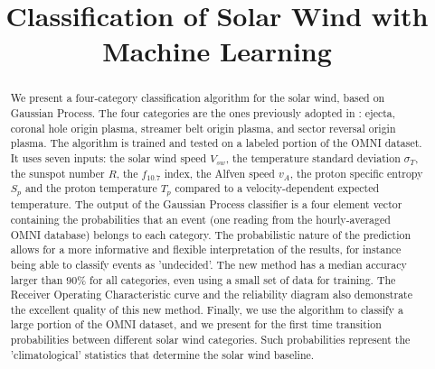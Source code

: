 \documentclass[draft,jgrga]{agutex}
\begin{document}
%
%


\title{Classification of Solar Wind with Machine Learning}
%

%

%
%









%
%


\begin{abstract}
We present a four-category classification algorithm for the solar wind, based on Gaussian Process. The four categories are the ones previously adopted in \citet{xu2015}: ejecta, coronal hole origin plasma, streamer belt origin plasma, and sector reversal origin plasma. The algorithm is trained and tested on a labeled portion of the OMNI dataset. It uses seven inputs: the solar wind speed $V_{sw}$, the temperature standard deviation $\sigma_T$, the sunspot number $R$, the $f_{10.7}$ index, the Alfven speed $v_A$, the proton specific entropy $S_p$ and the proton temperature $T_p$ compared to a velocity-dependent expected temperature. 
The output of the Gaussian Process classifier is a four element vector containing the probabilities that an event (one reading from the hourly-averaged OMNI database) belongs to each category. The probabilistic nature of the prediction allows for a more informative and flexible interpretation of the results, for instance being able to classify events as 'undecided'.
The new method has a median accuracy larger than $90\%$ for all categories, even using a small set of data for training. The Receiver Operating Characteristic curve and the reliability diagram also demonstrate the excellent quality of this new method.
Finally, we use the algorithm to classify a large portion of the OMNI dataset, and we present for the first time transition probabilities between different solar wind categories. Such probabilities represent the 'climatological' statistics that determine the solar wind baseline.
\end{abstract}
\end{document}
